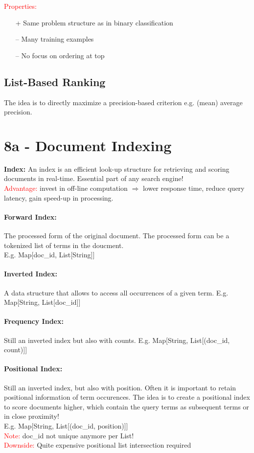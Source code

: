 \documentclass[a4paper,11pt]{article}
\newcommand{\msection}[1]{\section{#1}\vspace{-0.5mm}}
\begin{document}
\begin{multicols}{2}
\textcolor{red}{Properties:}
\begin{itemize}
  \item[+] Same problem structure as in binary classification
  \item[--] Many training examples
  \item[--] No focus on ordering at top
\end{itemize}

\subsection{List-Based Ranking}
The idea is to directly maximize a precision-based criterion e.g. (mean) average precision.


\msection{8a - Document Indexing}
\textbf{Index: } An index is an efficient look-up structure for retrieving and scoring documents in real-time. Essential part of any search engine!\\
\textcolor{red}{Advantage:} invest in off-line computation $\Rightarrow$ lower response time, reduce query latency, gain speed-up in processing.

\paragraph{Forward Index:} The processed form of the original document. The processed form can be a tokenized list of terms in the doucment.\\
E.g. Map[doc\_id, List[String]]

\paragraph{Inverted Index:} A data structure that allows to access all occurrences of a given term. E.g. Map[String, List[doc\_id]]

\paragraph{Frequency Index:} Still an inverted index but also with counts. E.g. Map[String, List[(doc\_id, count)]]

\paragraph{Positional Index:} Still an inverted index, but also with position. Often it is important to retain positional information of term occurences. The idea is to create a positional index to score documents higher, which contain the query terms as subsequent terms or in close proximity! \\
E.g. Map[String, List[(doc\_id, position)]]\\
\textcolor{red}{Note:} doc\_id not unique anymore per List!\\
\textcolor{red}{Downside:} Quite expensive positional list intersection required


\end{multicols}
\end{document}
